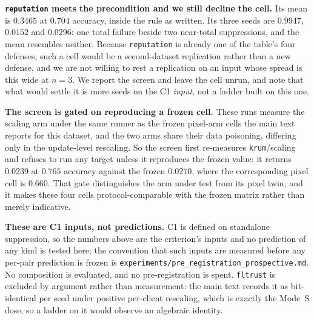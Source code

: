 \documentclass{article}
\begin{document}
\textbf{\texttt{reputation} meets the precondition and we still decline the cell.} Its mean is
$0.3465$ at $0.704$ accuracy, inside the rule as written. Its three seeds are $0.9947$, $0.0152$
and $0.0296$: one total failure beside two near-total suppressions, and the mean resembles
neither. Because \texttt{reputation} is already one of the table's four defenses, such a cell
would be a second-dataset replication rather than a new defense, and we are not willing to rest a
replication on an input whose spread is this wide at $n{=}3$. We report the screen and leave the
cell unrun, and note that what would settle it is more seeds on the C1 \emph{input}, not a
ladder built on this one.

\textbf{The screen is gated on reproducing a frozen cell.} These runs measure the scaling arm
under the same runner as the frozen pixel-arm cells the main text reports for this dataset, and the
two arms share their data poisoning, differing only in the update-level rescaling. So the screen
first re-measures \texttt{krum}/scaling and refuses to run any target unless it reproduces the
frozen value: it returns $0.0239$ at $0.765$ accuracy against the frozen $0.0270$, where the
corresponding pixel cell is $0.660$. That gate distinguishes the arm under test from its pixel
twin, and it makes these four cells protocol-comparable with the frozen matrix rather than
merely indicative.

\textbf{These are C1 inputs, not predictions.} C1 is defined on standalone suppression, so the
numbers above are the criterion's inputs and no prediction of any kind is tested here; the
convention that such inputs are measured before any per-pair prediction is frozen is
\texttt{experiments/pre\_registration\_prospective.md}. No composition is evaluated, and no
pre-registration is spent. \texttt{fltrust} is excluded by argument rather than measurement:
the main text records it as bit-identical per seed under positive
per-client rescaling, which is exactly the Mode~S dose, so a ladder on it would observe an
algebraic identity.

\end{document}
